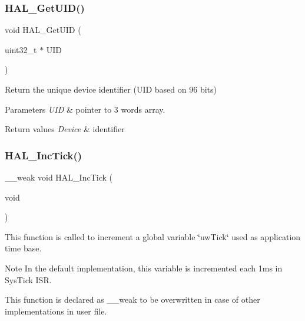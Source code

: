 \subsubsection{\texorpdfstring{H\+A\+L\+\_\+\+Get\+U\+I\+D()}{HAL\_GetUID()}}
{\footnotesize\ttfamily void H\+A\+L\+\_\+\+Get\+U\+ID (\begin{DoxyParamCaption}\item[{uint32\+\_\+t $\ast$}]{U\+ID }\end{DoxyParamCaption})}



Return the unique device identifier (U\+ID based on 96 bits) 


\begin{DoxyParams}{Parameters}
{\em U\+ID} & pointer to 3 words array. \\
\hline
\end{DoxyParams}

\begin{DoxyRetVals}{Return values}
{\em Device} & identifier \\
\hline
\end{DoxyRetVals}
\mbox{\label{group___h_a_l___exported___functions___group2_gaba5b726bfedd013bf7bb5a51d5c4f188}} 
\subsubsection{\texorpdfstring{H\+A\+L\+\_\+\+Inc\+Tick()}{HAL\_IncTick()}}
{\footnotesize\ttfamily \+\_\+\+\_\+weak void H\+A\+L\+\_\+\+Inc\+Tick (\begin{DoxyParamCaption}\item[{void}]{ }\end{DoxyParamCaption})}



This function is called to increment a global variable \char`\"{}uw\+Tick\char`\"{} used as application time base. 

\begin{DoxyNote}{Note}
In the default implementation, this variable is incremented each 1ms in Sys\+Tick I\+SR. 

This function is declared as \+\_\+\+\_\+weak to be overwritten in case of other implementations in user file. 
\end{DoxyNote}

